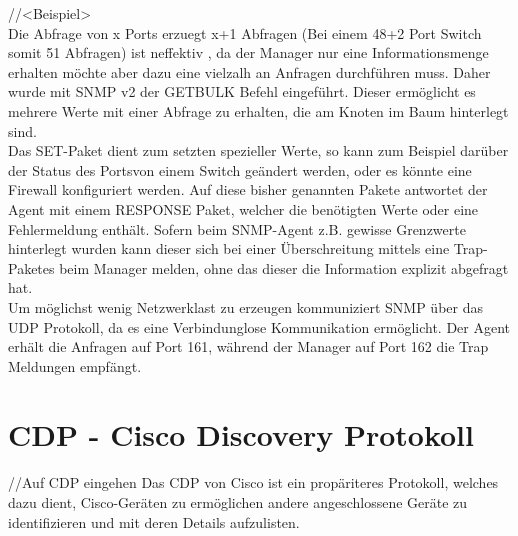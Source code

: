 //<Beispiel>\\

Die Abfrage von x Ports erzuegt x+1 Abfragen (Bei einem 48+2 Port Switch somit 51 Abfragen) ist neffektiv , da der Manager nur eine Informationsmenge erhalten möchte aber dazu eine vielzalh an Anfragen durchführen muss. Daher wurde mit SNMP v2 der GETBULK Befehl eingeführt. Dieser ermöglicht es mehrere Werte mit einer Abfrage zu erhalten, die am Knoten im Baum hinterlegt sind.\\
Das SET-Paket dient zum setzten spezieller Werte, so kann zum Beispiel darüber der Status des Portsvon einem Switch  geändert werden, oder es könnte eine Firewall konfiguriert werden.
Auf diese bisher genannten Pakete antwortet der Agent mit einem RESPONSE Paket, welcher die benötigten Werte oder eine Fehlermeldung enthält.
Sofern beim SNMP-Agent z.B. gewisse Grenzwerte hinterlegt wurden kann dieser sich bei einer Überschreitung mittels eine Trap-Paketes beim Manager melden, ohne das dieser die Information explizit abgefragt hat.\\
Um möglichst wenig Netzwerklast zu erzeugen kommuniziert SNMP über das UDP Protokoll, da es eine Verbindunglose Kommunikation ermöglicht. Der Agent erhält die Anfragen auf Port 161, während der Manager auf Port 162 die Trap Meldungen empfängt.\\

\section{CDP - Cisco Discovery Protokoll}
\label{sec:cdp}

//Auf CDP eingehen
Das CDP von Cisco ist ein propäriteres Protokoll, welches dazu dient, Cisco-Geräten zu ermöglichen andere angeschlossene Geräte zu identifizieren und mit deren Details aufzulisten.\\